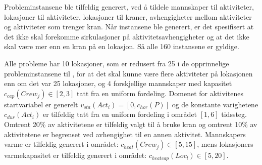 Probleminstansene ble tilfeldig generert, ved å tildele mannskaper til aktiviteter, lokasjoner til aktiviteter, lokasjoner til kraner, avhengigheter mellom aktiviteter og aktiviteter som trenger kran. Når instansene ble generert, er det spesifisert at det ikke skal forekomme sirkulasjoner på aktivitetsavhengigheter og at det ikke skal være mer enn en kran på en lokasjon. Så alle 160 instansene er gyldige.

Alle probleme har 10 lokasjoner, som er redusert fra 25 i de opprinnelige probleminstansene til \bht, for at det skal kunne være flere aktiviteter på lokasjonen enn om det var 25 lokasjoner, og 4 forskjellige mannskaper med kapasitet $ c_{cap}(Crew_{j}) \in [2,3] $ tatt fra en uniform fordeling. Domenet for aktivitenes startvariabel er generelt $ v_{sta}(Act_{i}) = [0,c_{hor}(P)] $ og de konstante varighetene $ c_{dur}(Act_{i}) $ er tilfeldig tatt fra en uniform fordeling i området $ [1,6] $ tidssteg. Omtrent 20\% av aktivitetene er tilfeldig valgt til å bruke kran og omtrent 10\% av aktivitetene er begrenset ved avhengighet til en annen aktivitet. Mannskapers varme er tilfeldig generert i området: $c_{heat}(Crew_{j}) \in [5,15]$, mens lokasjoners varmekapasitet er tilfeldig generert i området: $c_{heatcap}(Loc_{l}) \in [5,20]$.